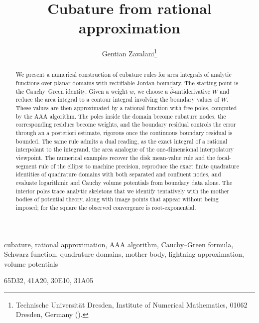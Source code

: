 \documentclass[onefignum,onetabnum]{siamart220329}
\begin{document}
\title{Cubature from rational approximation}

\author{Gentian Zavalani\thanks{Technische Universit{\"a}t Dresden, %
  Institute of Numerical Mathematics, %
  01062 Dresden, Germany
().}}


\maketitle

\begin{abstract}
We present a numerical construction of cubature rules for area
integrals of analytic functions over planar domains with rectifiable
Jordan boundary. The starting point is the Cauchy--Green identity.
Given a weight $w$, we choose a $\bar\partial$-antiderivative $W$ and
reduce the area integral to a contour integral involving the boundary
values of $W$. These values are then approximated by a rational
function with free poles, computed by the AAA algorithm. The poles
inside the domain become cubature nodes, the corresponding residues
become weights, and the boundary residual controls the error through
an a posteriori estimate, rigorous once the continuous boundary
residual is bounded. The same rule admits a dual reading, as the exact
integral of a rational interpolant to the integrand, the area analogue
of the one-dimensional interpolatory viewpoint.
The numerical examples recover the disk mean-value rule and the
focal-segment rule of the ellipse to machine precision, reproduce the
exact finite quadrature identities of quadrature domains with both
separated and confluent nodes, and evaluate logarithmic and Cauchy
volume potentials from boundary data alone. The interior poles trace
analytic skeletons that we identify tentatively with the mother bodies
of potential theory, along with image points that appear without being
imposed; for the square the observed convergence is root-exponential.
\end{abstract}


\begin{keywords}
cubature, rational approximation, AAA algorithm, Cauchy--Green
formula,\linebreak
Schwarz function, quadrature domains, mother body, lightning
approximation, volume potentials
\end{keywords}


\begin{MSCcodes}
65D32, 41A20, 30E10, 31A05
\end{MSCcodes}
\end{document}
